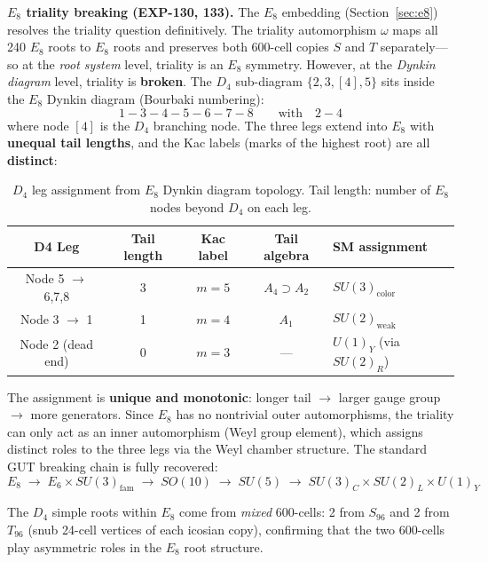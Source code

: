 \documentclass[12pt,a4paper]{article}
\begin{document}
\textbf{$E_8$ triality breaking (EXP-130, 133).} The $E_8$ embedding (Section~\ref{sec:e8}) resolves the triality question definitively. The triality automorphism $\omega$ maps all 240 $E_8$ roots to $E_8$ roots and preserves both 600-cell copies $S$ and $T$ separately---so at the \emph{root system} level, triality is an $E_8$ symmetry. However, at the \emph{Dynkin diagram} level, triality is \textbf{broken}. The $D_4$ sub-diagram $\{2, 3, [4], 5\}$ sits inside the $E_8$ Dynkin diagram (Bourbaki numbering):
\begin{equation}
1 - 3 - \boxed{4} - 5 - 6 - 7 - 8 \qquad \text{with} \quad 2 - \boxed{4}
\end{equation}
where node $[4]$ is the $D_4$ branching node. The three legs extend into $E_8$ with \textbf{unequal tail lengths}, and the Kac labels (marks of the highest root) are all \textbf{distinct}:

\begin{table}[H]
\centering
\begin{tabular}{ccccl}
\toprule
\textbf{D4 Leg} & \textbf{Tail length} & \textbf{Kac label} & \textbf{Tail algebra} & \textbf{SM assignment} \\
\midrule
Node 5 $\to$ 6,7,8 & 3 & $m = 5$ & $A_4 \supset A_2$ & $SU(3)_{\text{color}}$ \\
Node 3 $\to$ 1       & 1 & $m = 4$ & $A_1$              & $SU(2)_{\text{weak}}$ \\
Node 2 (dead end)     & 0 & $m = 3$ & ---                & $U(1)_Y$ (via $SU(2)_R$) \\
\bottomrule
\end{tabular}
\caption{$D_4$ leg assignment from $E_8$ Dynkin diagram topology. Tail length: number of $E_8$ nodes beyond $D_4$ on each leg.}
\end{table}

The assignment is \textbf{unique and monotonic}: longer tail $\to$ larger gauge group $\to$ more generators. Since $E_8$ has no nontrivial outer automorphisms, the triality can only act as an inner automorphism (Weyl group element), which assigns distinct roles to the three legs via the Weyl chamber structure. The standard GUT breaking chain is fully recovered:
\begin{equation}
E_8 \;\to\; E_6 \times SU(3)_{\text{fam}} \;\to\; SO(10) \;\to\; SU(5) \;\to\; SU(3)_C \times SU(2)_L \times U(1)_Y
\end{equation}

The $D_4$ simple roots within $E_8$ come from \emph{mixed} 600-cells: 2 from $S_{96}$ and 2 from $T_{96}$ (snub 24-cell vertices of each icosian copy), confirming that the two 600-cells play asymmetric roles in the $E_8$ root structure.
\end{document}
